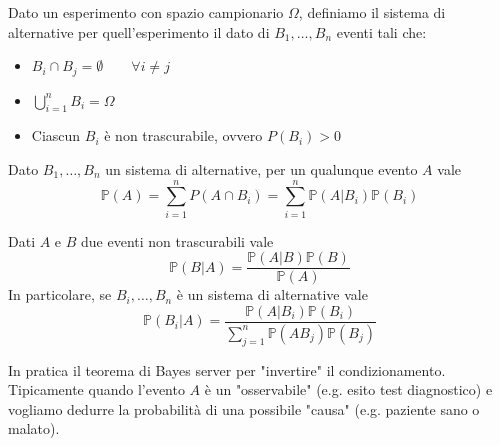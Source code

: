 \begin{definition}
	Dato un esperimento con spazio campionario $\Omega$, definiamo il sistema di alternative per quell'esperimento il dato di $B_1, \ldots, B_n$ eventi tali che:
	\begin{itemize}
		\item $B_i \cap B_j = \emptyset \qquad \forall i \neq j$
		\item $\bigcup_{i=1}^n B_i = \Omega$
		\item Ciascun $B_i$ è non trascurabile, ovvero $P(B_i)> 0$
	\end{itemize}
\end{definition}

\begin{theorem}
	Dato $B_1, \ldots, B_n$ un sistema di alternative, per un qualunque evento $A$ vale
	\begin{equation}
		\mathbb{P}(A) = \sum_{i=1}^{n} P(A \cap B_i)= \sum_{i=1}^{n} \mathbb{P}(A \vert B_i) \mathbb{P}(B_i)
	\end{equation}
\end{theorem}

\begin{theorem}
	Dati $A$ e $B$ due eventi non trascurabili vale
	\begin{equation}
		\mathbb{P}(B \vert A) = \frac{\mathbb{P}(A \vert B)\mathbb{P}(B)}{\mathbb{P}(A)}
	\end{equation}
	In particolare, se $B_i, \ldots, B_n$ è un sistema di alternative vale
	\begin{equation}
		\mathbb{P}(B_i \vert A) = \frac{\mathbb{P}(A \vert B_i)\mathbb{P}(B_i)}{\sum_{j=1}^{n} \mathbb{P}(A B_j)\mathbb{P}(B_j)}
	\end{equation}
\end{theorem}

\begin{note}
	In pratica il teorema di Bayes server per "invertire" il condizionamento. Tipicamente quando l'evento $A$ è un "osservabile" (e.g. esito test diagnostico) e vogliamo dedurre la probabilità di una possibile "causa" (e.g. paziente sano o malato).
\end{note}

